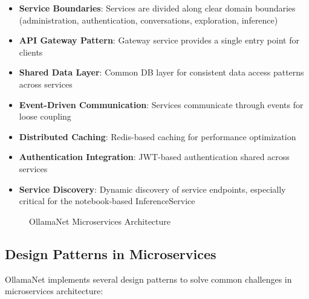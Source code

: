 \begin{itemize}
    \item \textbf{Service Boundaries}: Services are divided along clear domain boundaries (administration, authentication, conversations, exploration, inference)
    \item \textbf{API Gateway Pattern}: Gateway service provides a single entry point for clients
    \item \textbf{Shared Data Layer}: Common DB layer for consistent data access patterns across services
    \item \textbf{Event-Driven Communication}: Services communicate through events for loose coupling
    \item \textbf{Distributed Caching}: Redis-based caching for performance optimization
    \item \textbf{Authentication Integration}: JWT-based authentication shared across services
    \item \textbf{Service Discovery}: Dynamic discovery of service endpoints, especially critical for the notebook-based InferenceService
\end{itemize}

\begin{figure}
    \centering
    \caption{OllamaNet Microservices Architecture}
    \label{fig:ollamanet-arch-details}
\end{figure}

\subsection{Design Patterns in Microservices}

OllamaNet implements several design patterns to solve common challenges in microservices architecture:


